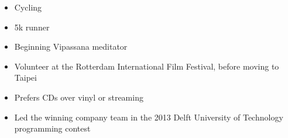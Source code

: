 





\begin{itemize}
\item\small{Cycling}
\item\small{5k runner}
\item\small{Beginning Vipassana meditator}
\item\small{Volunteer at the Rotterdam International Film Festival, before moving to Taipei}
\item\small{Prefers CDs over vinyl or streaming}
\item\small{Led the winning company team in the 2013 Delft University of Technology programming contest}
\end{itemize}

%